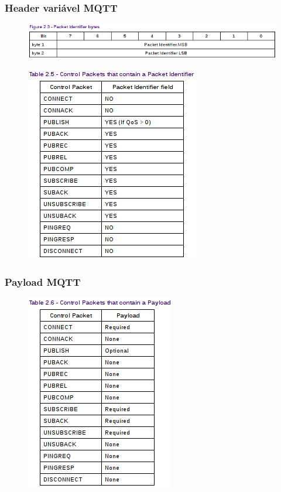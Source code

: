 \documentclass{beamer}
\begin{document}

\begin{frame}
\frametitle{Header variável MQTT}


\begin{figure}
\centering
\includegraphics[scale=0.3]{MQTT-PacketIdentifier}
\end{figure}

\begin{figure}
\centering
\includegraphics[scale=0.5]{MQTT-ControlPacketsWithIdentifier}
\end{figure}


\end{frame}


\begin{frame}
\frametitle{Payload MQTT}

\begin{figure}
\centering
\includegraphics[scale=0.5]{MQTT-ControlPacketsWithPayload}
\end{figure}


\end{frame}
\end{document}
